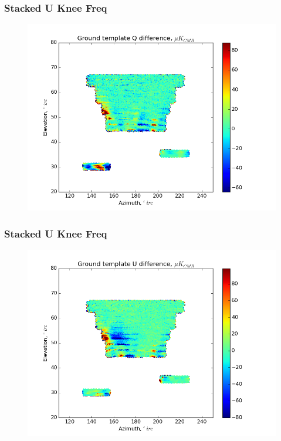 \documentclass{beamer}
\begin{document}
\begin{frame}
\frametitle{Stacked U Knee Freq}
\begin{figure}
\includegraphics[width=0.9\linewidth]{dQ_gt_STACK_U_FKNEE.png}
\end{figure}
\end{frame}

\begin{frame}
\frametitle{Stacked U Knee Freq}
\begin{figure}
\includegraphics[width=0.9\linewidth]{dU_gt_STACK_U_FKNEE.png}
\end{figure}
\end{frame}
\end{document}
